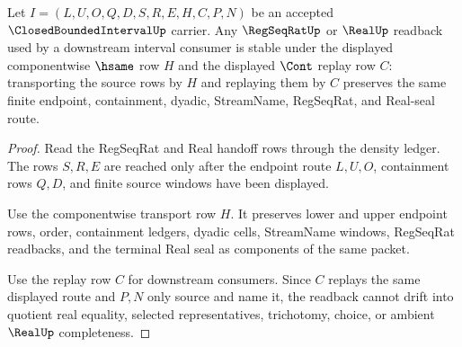 \begin{theorem}
\label{thm:closed-bounded-interval-source-readback-stability}
Let $I=(L,U,O,Q,D,S,R,E,H,C,P,N)$ be an accepted $\ClosedBoundedIntervalUp$ carrier. Any $\RegSeqRatUp$ or $\RealUp$ readback used by a downstream interval consumer is stable under the displayed componentwise $\hsame$ row $H$ and the displayed $\Cont$ replay row $C$: transporting the source rows by $H$ and replaying them by $C$ preserves the same finite endpoint, containment, dyadic, StreamName, RegSeqRat, and Real-seal route.
\end{theorem}
\begin{proof}
Read the RegSeqRat and Real handoff rows through the density ledger. The rows $S,R,E$ are reached only after the endpoint route $L,U,O$, containment rows $Q,D$, and finite source windows have been displayed.

Use the componentwise transport row $H$. It preserves lower and upper endpoint rows, order, containment ledgers, dyadic cells, StreamName windows, RegSeqRat readbacks, and the terminal Real seal as components of the same packet.

Use the replay row $C$ for downstream consumers. Since $C$ replays the same displayed route and $P,N$ only source and name it, the readback cannot drift into quotient real equality, selected representatives, trichotomy, choice, or ambient $\RealUp$ completeness.
\end{proof}

